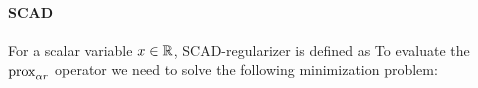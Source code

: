 \paragraph{SCAD}

For a scalar variable $x \in \operatorname{\mathbb{R}}$, SCAD-regularizer is defined as 
To evaluate the ${\mathrm{prox}}_{\alpha r}$ operator we need to solve the following minimization problem:


